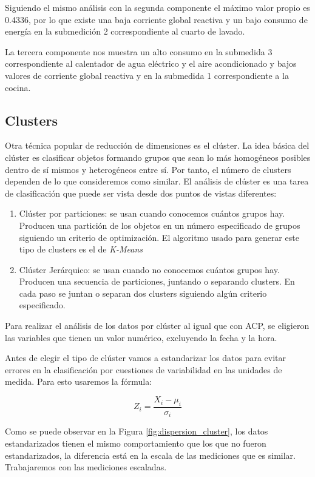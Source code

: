 \documentclass[a4paper,10pt,twocolumn]{report}
\begin{document}
	Siguiendo el mismo análisis con la segunda componente el máximo valor propio es 0.4336, por lo que existe una baja corriente global reactiva y un bajo consumo de energía en la submedición 2 correspondiente al cuarto de lavado.

	La tercera componente nos muestra un alto consumo en la submedida 3 correspondiente al calentador de agua eléctrico y el aire acondicionado y bajos valores de corriente global reactiva y en la submedida 1 correspondiente a la cocina.
	
	\subsection{Clusters}
	
	Otra técnica popular de reducción de dimensiones es el clúster. La idea básica del clúster es clasificar objetos formando grupos que sean lo más homogéneos posibles dentro de sí mismos y heterogéneos entre sí. Por tanto, el número de clusters dependen de lo que consideremos como similar. El análisis de clúster es una tarea de clasificación que puede ser vista desde dos puntos de vistas diferentes:
	\begin{enumerate}
		\item Clúster por particiones: se usan cuando conocemos cuántos grupos hay. Producen una partición de los objetos en un número especificado de grupos siguiendo un criterio de optimización. El algoritmo usado para generar este tipo de clusters es el de \textit{K-Means}
		\item Clúster Jerárquico: se usan cuando no conocemos cuántos grupos hay. Producen una secuencia de particiones, juntando o separando clusters. En cada paso se juntan o separan dos clusters siguiendo algún criterio especificado.
	\end{enumerate}
	
	Para realizar el análisis de los datos por clúster al igual que con ACP, se eligieron las variables que tienen un valor numérico, excluyendo la fecha y la hora.
	
	Antes de elegir el tipo de clúster vamos a estandarizar los datos para evitar errores en la clasificación por cuestiones de variabilidad en las unidades de medida. Para esto usaremos la fórmula:
	
	\begin{equation*}
		Z_i = \dfrac{X_i - \mu_i}{\sigma_i}
	\end{equation*}
	
	Como se puede observar en la Figura \ref{fig:dispersion_cluster}, los datos estandarizados tienen el mismo comportamiento que los que no fueron estandarizados, la diferencia está en la escala de las mediciones que es similar. Trabajaremos con las mediciones escaladas.
	
\end{document}
